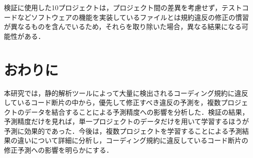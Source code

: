 \documentclass[T,J]{fose} %
\begin{document}
検証に使用した10プロジェクトは，プロジェクト間の差異を考慮せず，テストコードなどソフトウェアの機能を実装しているファイルとは規約違反の修正の慣習が異なるものを含んでいるため，それらを取り除いた場合，異なる結果になる可能性がある．






\section{おわりに}\label{sec:end}
本研究では，静的解析ツールによって大量に検出されるコーディング規約に違反しているコード断片の中から，優先して修正すべき違反の予測を，複数プロジェクトのデータを結合することによる予測精度への影響を分析した．検証の結果，予測精度だけを見れば，単一プロジェクトのデータだけを用いて学習するほうが予測に効果的であった．今後は，複数プロジェクトを学習することによる予測結果の違いについて詳細に分析し，コーディング規約に違反しているコード断片の修正予測への影響を明らかにする．






\end{document}
